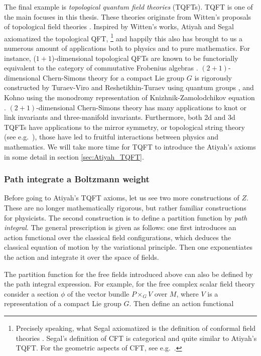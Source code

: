 The final example is \emph{topological quantum field theories} (TQFTs).
TQFT is one of the main focuses in this thesis. These theories
originate from Witten's proposals of topological field theories
\cite{Witten:1988xj, Witten:1988ze, Witten:1988hf}. Inspired by Witten's
works, Atiyah and Segal axiomatized the topological QFT,%
%
\footnote{Precisely speaking, what Segal axiomatized is the definition of conformal
field theories \cite{Segal:2002ei}. Segal's definition of CFT is categorical
and quite similar to Atiyah's TQFT.
For the geometric aspects of CFT, see e.g.~\cite{Friedan:1986ua}. }
%
and happily this also has brought to us a numerous amount of applications
both to physics and to pure mathematics. For instance, ($1+1$)-dimensional
topological QFTs are known to be functorially equivalent to the category of commutative
Frobenius algebras \cite{MR2037238}. $(2+1)$-dimensional Chern-Simons theory for a
compact Lie group $G$ is rigorously constructed by
Turaev-Viro and Reshetikhin-Turaev using quantum groups \cite{Turaev:1992hq, Reshetikhin:1991tc},
and Kohno \cite{MR1167165} using
the monodromy representation of Knizhnik-Zamolodchikov equation \cite{Knizhnik:1984nr}.
$(2+1)$-dimensional Chern-Simons theory has many
applications to knot or link invariants and three-manifold invariants.
Furthermore, both 2d and 3d TQFTs have applications to the mirror symmetry,
or topological string theory (see e.g.~\cite{Hori:2003ic}), those have led to fruitful interactions
between physics and mathematics. We will take more time for TQFT to
introduce the Atiyah's axioms in some detail in section \ref{sec:Atiyah_TQFT}.





\subsubsection*{Path integrate a Boltzmann weight}

Before going to Atiyah's TQFT axioms, let us see two more constructions
of $Z$. These are no longer mathematically rigorous, but rather familiar
constructions for physicists. The second construction is to define
a partition function by \emph{path integral}. The general prescription
is given as follows: one first introduces an action functional over
the classical field configurations, which deduces the classical equation
of motion by the variational principle. Then one exponentiates the
action and integrate it over the space of fields.

The partition function for the free fields introduced above can also be
defined by the path integral expression. For example, for the free
complex scalar field theory consider a section $\phi$ of the vector
bundle $P\times_{G}V$ over $M$, where $V$ is a representation of
a compact Lie group $G$. Then define an action functional

